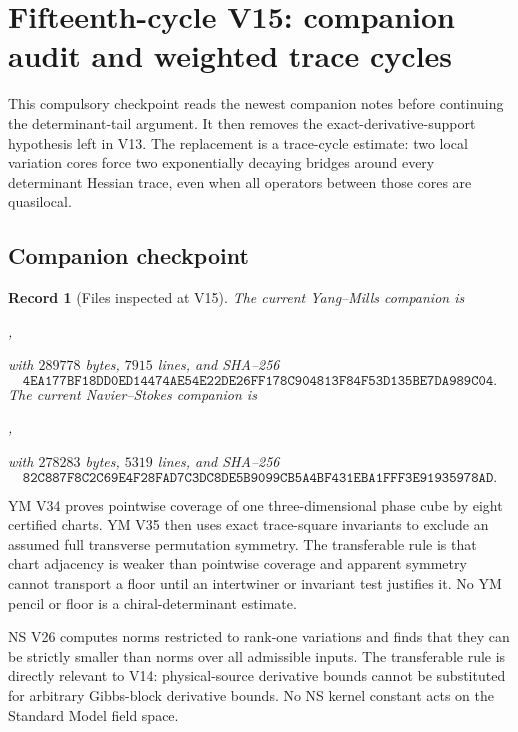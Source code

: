 \documentclass[11pt]{article}
\newtheorem{record}[theorem]{Record}
\theoremstyle{remark}
\begin{document}
\section{Fifteenth-cycle V15: companion audit and weighted trace cycles}
\label{sec:v15v15}

This compulsory checkpoint reads the newest companion notes before
continuing the determinant-tail argument.  It then removes the
exact-derivative-support hypothesis left in V13.  The replacement is
a trace-cycle estimate: two local variation cores force two
exponentially decaying bridges around every determinant Hessian
trace, even when all operators between those cores are quasilocal.

\subsection{Companion checkpoint}

\begin{record}[Files inspected at V15]
\label{rec:v15v15-companions}
The current Yang--Mills companion is
\begin{center}
,
\end{center}
with \(289778\) bytes, \(7915\) lines, and SHA--256
\[
 \texttt{4EA177BF18DD0ED14474AE54E22DE26FF178C904813F84F53D135BE7DA989C04}.
                                                               \tag{15.1}
\]
The current Navier--Stokes companion is
\begin{center}
,
\end{center}
with \(278283\) bytes, \(5319\) lines, and SHA--256
\[
 \texttt{82C887F8C2C69E4F28FAD7C3DC8DE5B9099CB5A4BF431EBA1FFF3E91935978AD}.
                                                               \tag{15.2}
\]
\end{record}

YM V34 proves pointwise coverage of one three-dimensional phase
cube by eight certified charts.  YM V35 then uses exact trace-square
invariants to exclude an assumed full transverse permutation
symmetry.  The transferable rule is that chart adjacency is weaker
than pointwise coverage and apparent symmetry cannot transport a
floor until an intertwiner or invariant test justifies it.  No YM
pencil or floor is a chiral-determinant estimate.

NS V26 computes norms restricted to rank-one variations and finds
that they can be strictly smaller than norms over all admissible
inputs.  The transferable rule is directly relevant to V14:
physical-source derivative bounds cannot be substituted for
arbitrary Gibbs-block derivative bounds.  No NS kernel constant
acts on the Standard Model field space.
\end{document}
